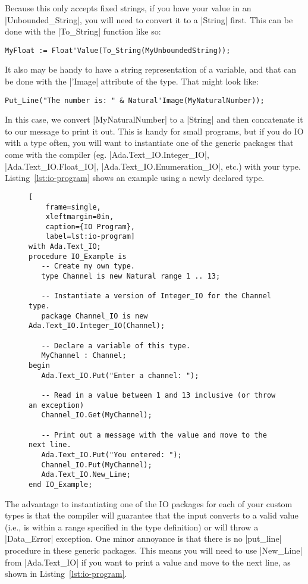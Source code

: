 \noindent Because this only accepts fixed strings, if you have your value in an
|Unbounded_String|, you will need to convert it to a |String| first. This can be done with the
|To_String| function like so:

\begin{lstlisting}
MyFloat := Float'Value(To_String(MyUnboundedString));
\end{lstlisting}

It also may be handy to have a string representation of a variable, and that can be done with
the |'Image| attribute of the type. That might look like:

\begin{lstlisting}
Put_Line("The number is: " & Natural'Image(MyNaturalNumber));
\end{lstlisting}

\noindent In this case, we convert |MyNaturalNumber| to a |String| and then concatenate it to
our message to print it out. This is handy for small programs, but if you do IO with a type
often, you will want to instantiate one of the generic packages that come with the compiler (eg.
|Ada.Text_IO.Integer_IO|, |Ada.Text_IO.Float_IO|, |Ada.Text_IO.Enumeration_IO|, etc.) with your
type. Listing~\ref{lst:io-program} shows an example using a newly declared type.

\begin{figure}[tbhp]
    \begin{lstlisting}[
    frame=single,
    xleftmargin=0in,
    caption={IO Program},
    label=lst:io-program]
with Ada.Text_IO;
procedure IO_Example is
   -- Create my own type.
   type Channel is new Natural range 1 .. 13;

   -- Instantiate a version of Integer_IO for the Channel type.
   package Channel_IO is new Ada.Text_IO.Integer_IO(Channel);

   -- Declare a variable of this type.
   MyChannel : Channel;
begin
   Ada.Text_IO.Put("Enter a channel: ");

   -- Read in a value between 1 and 13 inclusive (or throw an exception)
   Channel_IO.Get(MyChannel);

   -- Print out a message with the value and move to the next line.
   Ada.Text_IO.Put("You entered: ");
   Channel_IO.Put(MyChannel);
   Ada.Text_IO.New_Line;
end IO_Example;
    \end{lstlisting}    
\end{figure}

The advantage to instantiating one of the IO packages for each of your custom types is that the
compiler will guarantee that the input converts to a valid value (i.e., is within a range
specified in the type definition) or will throw a |Data_Error| exception. One minor annoyance is
that there is no |put_line| procedure in these generic packages. This means you will need to use
|New_Line| from |Ada.Text_IO| if you want to print a value and move to the next line, as shown
in Listing~\ref{lst:io-program}.
